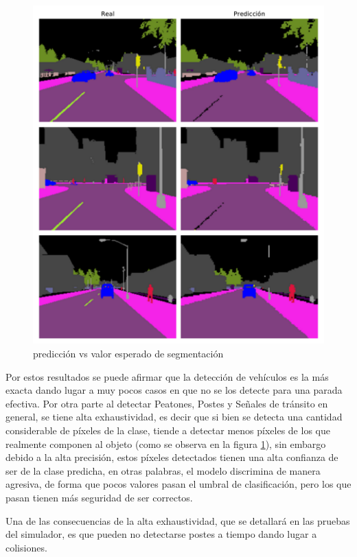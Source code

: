 	\begin{figure}[H]
		\centering
		\includegraphics[scale=0.6]{imagenes/preds/semseg}
		\caption[Predicción vs valor esperado de segmentación]{predicción vs valor esperado de segmentación}
		\label{semsegpred}
	\end{figure}
	
	Por estos resultados se puede afirmar que la detección de vehículos es la más exacta dando lugar a muy pocos casos en que no se los detecte para una parada efectiva. Por otra parte al detectar Peatones, Postes y Señales de tránsito en general, se tiene alta exhaustividad, es decir que si bien se detecta una cantidad considerable de píxeles de la clase, tiende a detectar menos píxeles de los que realmente componen al objeto (como se observa en la figura \ref{semsegpred}), sin embargo debido a la alta precisión, estos píxeles detectados tienen una alta confianza de ser de la clase predicha, en otras palabras, el modelo discrimina de manera agresiva, de forma que pocos valores pasan el umbral de clasificación, pero los que pasan tienen más seguridad de ser correctos.
	
	Una de las consecuencias de la alta exhaustividad, que se detallará en las pruebas del simulador, es que pueden no detectarse postes a tiempo dando lugar a colisiones.
	
